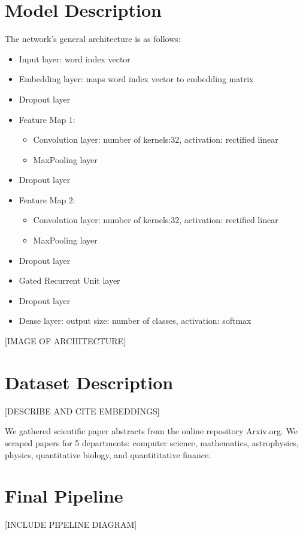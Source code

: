 \section{Model Description}
The network's general architecture is as follows:
\begin{itemize}
  \item Input layer: word index vector
  \item Embedding layer: maps word index vector to embedding matrix
  \item Dropout layer
  \item Feature Map 1:
      \begin{itemize}
        \item Convolution layer: number of kernels:32, activation: rectified linear
        \item MaxPooling layer
      \end{itemize}
\item Dropout layer
\item Feature Map 2:
    \begin{itemize}
      \item Convolution layer: number of kernels:32, activation: rectified linear
      \item MaxPooling layer
    \end{itemize}
\item Dropout layer
\item Gated Recurrent Unit layer
\item Dropout layer
\item Dense layer: output size: number of classes, activation: softmax
\end{itemize}
[IMAGE OF ARCHITECTURE]

\section{Dataset Description}
[DESCRIBE AND CITE EMBEDDINGS]

We gathered scientific paper abstracts from the online repository Arxiv.org.
We scraped papers for 5 departments: computer science, mathematics, astrophysics, physics, quantitative biology, and quantititative finance.

\section{Final Pipeline}
[INCLUDE PIPELINE DIAGRAM]
